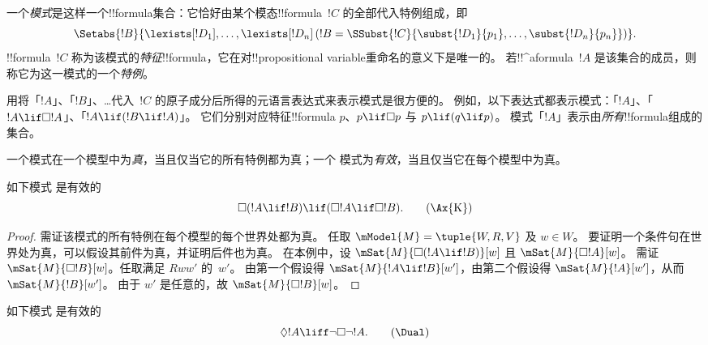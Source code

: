 \documentclass[../../../include/open-logic-section]{subfiles}
\begin{document}


\begin{defn}
  一个\emph{模式}是这样一个!!{formula}集合：它恰好由某个模态!!{formula}~$!C$ 的全部代入特例组成，即
  \[
  \Setabs{!B}{\lexists[!D_1], \dots, \lexists[!D_n] \left(!B =
  \SSubst{!C}{\subst{!D_1}{p_1}, \dots, \subst{!D_n}{p_n}} \right) }.
  \]
  !!{formula}~$!C$ 称为该模式的\emph{特征}!!{formula}，它在对!!{propositional variable}重命名的意义下是唯一的。
  若!!^a{formula}~$!A$ 是该集合的成员，则称它为这一模式的一个\emph{特例}。
\end{defn}

用将「$!A$」、「$!B$」、\dots 代入~$!C$ 的原子成分后所得的元语言表达式来表示模式是很方便的。
例如，以下表达式都表示模式：「$!A$」、「$!A \lif \Box!A$」、「$!A \lif (!B \lif !A)$」。
它们分别对应特征!!{formula} $p$、$p \lif \Box p$ 与 $p \lif (q \lif p)$。
模式「$!A$」表示由\emph{所有}!!{formula}组成的集合。

\begin{defn}
  一个模式在一个模型中为\emph{真}，当且仅当它的所有特例都为真；一个
  模式为\emph{有效}，当且仅当它在每个模型中为真。
\end{defn}

\begin{prop}
  如下模式  是有效的
  \begin{equation*}
  \Box(!A \lif !B) \lif (\Box !A \lif \Box !B). \tag{\Ax{K}}
  \end{equation*}
\end{prop}

\begin{proof}
  需证该模式的所有特例在每个模型的每个世界处都为真。
  任取 $\mModel{M} = \tuple{W,R,V}$ 及 $w \in W$。
  要证明一个条件句在世界处为真，可以假设其前件为真，并证明后件也为真。
  在本例中，设 $\mSat{M}{\Box(!A \lif !B)}[w]$ 且 $\mSat{M}{\Box !A}[w]$。
  需证 $\mSat{M}{\Box !B}[w]$。任取满足 $Rww'$ 的~$w'$。
  由第一个假设得 $\mSat{M}{!A \lif !B}[w']$，由第二个假设得 $\mSat{M}{!A}[w']$，从而 $\mSat{M}{!B}[w']$。
  由于 $w'$ 是任意的，故 $\mSat{M}{\Box !B}[w]$。
\end{proof}

\begin{prop}
  如下模式 \Dual{} 是有效的
  \begin{equation*}
  \Diamond !A \liff \lnot\Box\lnot !A. \tag{\Dual}
  \end{equation*}
\end{prop}
\end{document}
